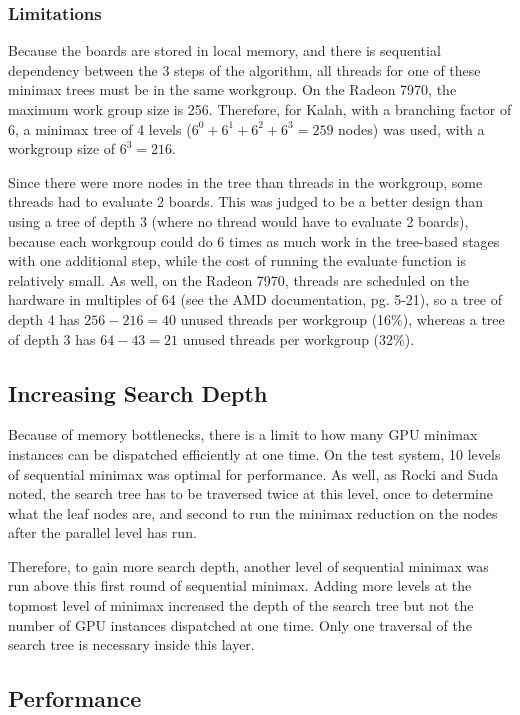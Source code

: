 \documentclass{article}
\begin{document}
\subsubsection{Limitations}
Because the boards are stored in local memory, and there is sequential dependency between the 3 steps of the algorithm, all threads for one of these minimax trees must be in the same workgroup. On the Radeon 7970, the maximum work group size is 256. Therefore, for Kalah, with a branching factor of 6, a minimax tree of 4 levels ($6^0 + 6^1 + 6^2 + 6^3 = 259$ nodes) was used, with a workgroup size of $6^3 = 216$.

Since there were more nodes in the tree than threads in the workgroup, some threads had to evaluate 2 boards. This was judged to be a better design than using a tree of depth 3 (where no thread would have to evaluate 2 boards), because each workgroup could do 6 times as much work in the tree-based stages with one additional step, while the cost of running the evaluate function is relatively small. As well, on the Radeon 7970, threads are scheduled on the hardware in multiples of 64 (see the AMD documentation\cite{amdapp}, pg. 5-21), so a tree of depth 4 has $256 - 216 = 40$ unused threads per workgroup (16\%), whereas a tree of depth 3 has $64 - 43 = 21$ unused threads per workgroup (32\%).

\subsection{Increasing Search Depth}
Because of memory bottlenecks, there is a limit to how many GPU minimax instances can be dispatched efficiently at one time. On the test system, 10 levels of sequential minimax was optimal for performance. As well, as Rocki and Suda\cite{rockisuda10} noted, the search tree has to be traversed twice at this level, once to determine what the leaf nodes are, and second to run the minimax reduction on the nodes after the parallel level has run.

Therefore, to gain more search depth, another level of sequential minimax was run above this first round of sequential minimax. Adding more levels at the topmost level of minimax increased the depth of the search tree but not the number of GPU instances dispatched at one time. Only one traversal of the search tree is necessary inside this layer.

\subsection{Performance}
\end{document}
